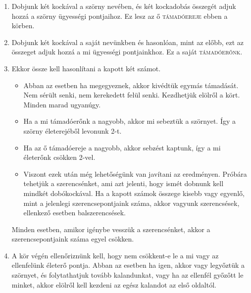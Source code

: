 \documentclass[12pt,a4paper,oneside]{report}
\begin{document}
        \begin{enumerate}
          \item Dobjunk két kockával a szörny nevében, és két kockadobás összegét adjuk
            hozzá a szörny ügyességi pontjaihoz. Ez lesz az ő \textsc{támadóereje} ebben a körben.
          \item Dobjunk két kockával a saját nevünkben és hasonlóan, mint az előbb,
            ezt az összeget adjuk hozzá a mi ügyességi pontjainkhoz. Ez a saját
            \textsc{támadóerőnk}.
          \item Ekkor össze kell hasonlítani a kapott két számot.
            \begin{itemize}
              \item Abban az esetben ha megegyeznek, akkor kivédtük egymás
                támadását. Nem sérült senki, nem kerekedett felül senki. Kezdhetjük
                elölről a kört. Minden marad ugyanúgy.
              \item Ha a mi támadóerőnk a nagyobb, akkor mi sebeztük a szörnyet. Így a
                szörny életerejéből levonunk 2-t.
              \item Ha az ő támadóereje a nagyobb, akkor sebzést kaptunk, így a mi
                életerőnk csökken 2-vel.
              \item Viszont ezek után még lehetőségünk van javítani az
                eredményen. Próbára tehetjük a szerencsénket, ami azt jelenti, hogy
                ismét dobnunk kell mindkét dobókockával. Ha a kapott számok összege
                kisebb vagy egyenlő, mint a jelenlegi szerencsepontjaink száma,
                akkor vagyunk szerencsések, ellenkező esetben
                balszerencsések.
            \end{itemize}
            Minden esetben, amikor igénybe vesszük a
            szerencsénket, akkor a szerencsepontjaink száma egyel csökken.
          \item A kör végén ellenőriznünk kell, hogy nem csökkent-e le a mi vagy az
            ellenfelünk életerő pontja. Abban az esetben ha igen, akkor vagy
            legyőztük a szörnyet, és folytathatjuk tovább kalandunkat, vagy ha
            az ellenfél győzőtt le minket, akkor elölről kell kezdeni az egész
            kalandot az első oldaltól.
        \end{enumerate} 
\end{document}
